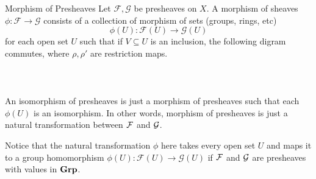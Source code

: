 \documentclass[a4paper]{article}
\begin{document}
\begin{defn}{Morphism of Presheaves}{} Let $\mathcal{F},\mathcal{G}$ be presheaves on $X$. A morphism of sheaves $\phi:\mathcal{F}\to\mathcal{G}$ consists of a collection of morphism of sets (groups, rings, etc) $$\phi(U):\mathcal{F}(U)\to\mathcal{G}(U)$$ for each open set $U$ such that if $V\subseteq U$ is an inclusion, the following digram commutes, where $\rho,\rho'$ are restriction maps. \\~\\
 \\~\\
An isomorphism of presheaves is just a morphism of presheaves such that each $\phi(U)$ is an isomorphism. In other words, morphism of presheaves is just a natural transformation between $\mathcal{F}$ and $\mathcal{G}$.  
\end{defn}

Notice that the natural transformation $\phi$ here takes every open set $U$ and maps it to a group homomorphism $\phi(U):\mathcal{F}(U)\to\mathcal{G}(U)$ if $\mathcal{F}$ and $\mathcal{G}$ are presheaves with values in $\bold{Grp}$. 
\end{document}
